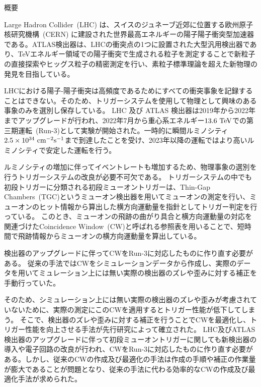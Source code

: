 \begin{center}
  \begin{huge}
    概要
  \end{huge}
\end{center}

\vspace{10pt}

Large Hadron Collider~(LHC) は、スイスのジュネーブ近郊に位置する欧州原子核研究機構~(CERN) に建設された世界最高エネルギーの陽子陽子衝突型加速器である。ATLAS検出器は、LHCの衝突点の1つに設置された大型汎用検出器であり、TeVエネルギー領域での陽子衝突で生成される粒子を測定することで新粒子の直接探索やヒッグス粒子の精密測定を行い、素粒子標準理論を超えた新物理の発見を目指している。

LHCにおける陽子-陽子衝突は高頻度であるためにすべての衝突事象を記録することはできない。そのため、トリガーシステムを使用して物理として興味のある事象のみを選別し保存している。
LHC 及び ATLAS 検出器は2019年から2022年までアップグレードが行われ、2022年7月から重心系エネルギー$13.6~{\rm TeV}$での第三期運転~(Run-3)として実験が開始された。一時的に瞬間ルミノシティ$2.5\times10^{34}~{\rm cm^{-2}s^{-1}}$まで到達したことを受け、2023年以降の運転ではより高いルミノシティで安定した運転を行う。

ルミノシティの増加に伴ってイベントレートも増加するため、物理事象の選別を行うトリガーシステムの改良が必要不可欠である。
トリガーシステムの中でも初段トリガーに分類される初段ミューオントリガーは、Thin-Gap Chambers~(TGC)というミューオン検出器を用いてミューオンの測定を行い、ミューオンのヒット情報から算出した横方向運動量を指針としてトリガー判定を行っている。
このとき、ミューオンの飛跡の曲がり具合と横方向運動量の対応を関連づけたCoincidence Window~(CW)と呼ばれる参照表を用いることで、短時間で飛跡情報からミューオンの横方向運動量を算出している。

検出器のアップグレードに伴ってCWをRun-3に対応したものに作り直す必要がある。
従来の手法ではCWをシミュレーションデータから作成し、実際のデータを用いてミュレーション上には無い実際の検出器のズレや歪みに対する補正を手動行っていた。

そのため、シミュレーション上には無い実際の検出器のズレや歪みが考慮されていないために、実際の測定にこのCWを適用するとトリガー性能が低下してしまう。
そこで、検出器のズレや歪みに対する補正を行うことでCWを最適化し、トリガー性能を向上させる手法が先行研究によって確立された。
LHC及びATLAS検出器のアップグレードに伴って初段ミューオントリガーに関しても新検出器の導入や電子回路の改良が行われ、CWをRun-3に対応したものに作り直す必要がある。しかし、従来のCWの作成及び最適化の手法は作成の手順や補正の作業量が膨大であることが問題となり、従来の手法に代わる効率的なCWの作成及び最適化手法が求められた。

